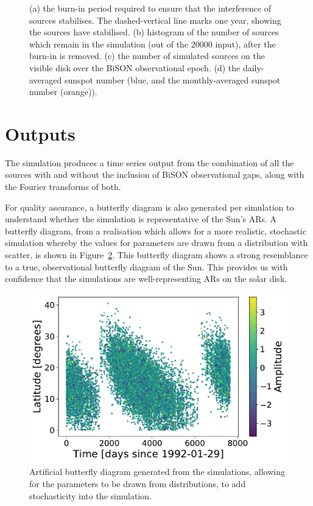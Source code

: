 \begin{figure}[!ht]
	\caption{(a) the burn-in period required to ensure that the interference of sources stabilises. The dashed-vertical line marks one year, showing the sources have stabilised. (b) histogram of the number of sources which remain in the simulation (out of the 20000 input), after the burn-in is removed. (c) the number of simulated sources on the visible disk over the BiSON observational epoch. (d) the daily-averaged sunspot number (blue, and the monthly-averaged sunspot number (orange)).}
	\label{fig:artificial_sim_config}
\end{figure}



\section{Outputs}


The simulation produces a time series output from the combination of all the sources with and without the inclusion of BiSON observational gaps, along with the Fourier transforms of both. 

For quality assurance, a butterfly diagram is also generated per simulation to understand whether the simulation is representative of the Sun's ARs. A butterfly diagram, from a realisation which allows for a more realistic, stochastic simulation whereby the values for parameters are drawn from a distribution with scatter, is shown in Figure~\ref{fig:fake_butterfly}. This butterfly diagram shows a strong resemblance to a true, observational butterfly diagram of the Sun. This provides us with confidence that the simulations are well-representing ARs on the solar disk.


\begin{figure}[ht!]
	\centering
	\includegraphics[width=0.85\columnwidth]{24h_fake_butterfly.pdf}
	\caption{Artificial butterfly diagram generated from the simulations, allowing for the parameters to be drawn from distributions, to add stochasticity into the simulation.}
	\label{fig:fake_butterfly}
\end{figure}


